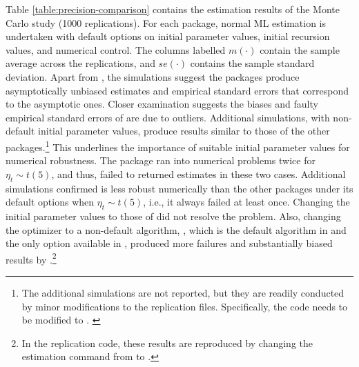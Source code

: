 Table \ref{table:precision-comparison} contains the estimation results of the Monte Carlo study (1000 replications). For each package, normal ML estimation is undertaken with default options on initial parameter values, initial recursion values, and numerical control. The columns labelled $m(\cdot)$ contain the sample average across the replications, and $se(\cdot)$ contains the sample standard deviation. Apart from , the simulations suggest the packages produce asymptotically unbiased estimates and empirical standard errors that correspond to the asymptotic ones. Closer examination suggests the biases and faulty empirical standard errors of  are due to outliers. Additional simulations, with non-default initial parameter values, produce results similar to those of the other packages.\footnote{The additional simulations are not reported, but they are readily conducted by minor modifications to the replication files. Specifically, the code  needs to be modified to . \label{footnote:tseries:more:robust:initial:values}} This underlines the importance of suitable initial parameter values for numerical robustness. The package  ran into numerical problems twice for $\eta_t\sim t(5)$, and thus, failed to returned estimates in these two cases. Additional simulations confirmed  is less robust numerically than the other packages under its default options when $\eta_t\sim t(5)$, i.e., it always failed at least once. Changing the initial parameter values to those of  did not resolve the problem. Also, changing the optimizer to a non-default algorithm, , which is the default algorithm in  and the only option available in , produced more failures and substantially biased results by .\footnote{In the replication code, these results are reproduced by changing the estimation command from  to .}

